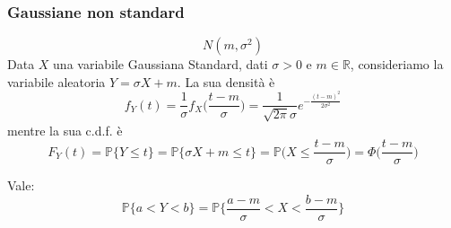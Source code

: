 \subsubsection{Gaussiane non standard}
\begin{equation}
	N(m, \sigma^2)
\end{equation}
Data $X$ una variabile Gaussiana Standard, dati $\sigma >0$ e $m \in \mathbb{R}$, consideriamo la variabile aleatoria $Y = \sigma X +m$. La sua densità è
\begin{equation}
	f_Y(t) = \frac{1}{\sigma}f_X\bigg(\frac{t-m}{\sigma}\bigg) = \frac{1}{\sqrt{2 \pi}\sigma}e^{-\frac{(t-m)^2}{2\sigma^2}}
\end{equation}
mentre la sua c.d.f. è
\begin{equation}
	F_Y(t)= \mathbb{P}\{Y \leq t\} = \mathbb{P}\{\sigma X + m \leq t\} = \mathbb{P}\bigg(X \leq \frac{t-m}{\sigma}\bigg) = \Phi \bigg(\frac{t-m}{\sigma}\bigg)
\end{equation}

\begin{observation}
	Vale:
	\begin{equation}
		\mathbb{P}\{a < Y < b\} = \mathbb{P}\bigg\{\frac{a-m}{\sigma} < X < \frac{b-m}{\sigma}\bigg\}
	\end{equation}
\end{observation}